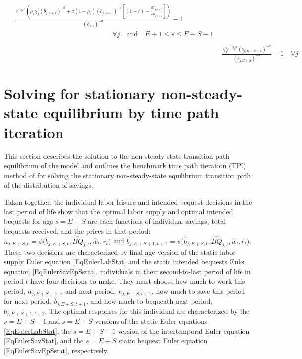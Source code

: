 \documentclass[letterpaper,12pt]{article}
\theoremstyle{definition}
\begin{document}
\begin{enumerate}
\begin{align}
        \begin{split}
          &\frac{e^{-g_y\sigma}\left(\rho_s\chi^b_j \left(\bar{b}_{j,s+1}\right)^{-\sigma} + \beta(1-\rho_s)(\bar{c}_{j,s+1})^{-\sigma}\left[(1 + \bar{r}) - \frac{\partial \bar{T}_{j,s+1}}{\partial \bar{b}_{j,s+1}}\right]\right)}{(\bar{c}_{j,s})^{-\sigma}} - 1 \\
          &\qquad\qquad\qquad\qquad\qquad\qquad\qquad\forall j \quad\text{and}\quad E+1\leq s\leq E+S-1 \\
        \end{split} \label{EqSSeulerrSav} \\
        &\frac{\chi^b_j e^{-g_y\sigma}(\bar{b}_{j,E+S+1})^{-\sigma}}{\left(\bar{c}_{j,E+S}\right)^{-\sigma}} - 1 \quad\forall j \label{EqSSeulerrBeq}
      \end{align}
  \end{enumerate}


\newpage
\section{Solving for stationary non-steady-state equilibrium by time path iteration}\label{AppNonSSsolve}

  \setcounter{equation}{0}

  This section describes the solution to the non-steady-state transition path equilibrium of the model and outlines the benchmark time path iteration (TPI) method of \citet{AuerbachKotlikoff:1987} for solving the stationary non-steady-state equilibrium transition path of the distribution of savings. 
 
  \vspace{10mm}

  \noindent Taken together, the individual labor-leisure and intended bequest decisions in the last period of life show that the optimal labor supply and optimal intended bequests for age $s=E+S$ are each functions of individual savings, total bequests received, and the prices in that period: $n_{j,E+S,t}=\phi\bigl(\hat{b}_{j,E+S,t},\hat{BQ}_{j,t},\hat{w}_t,r_t\bigr)$ and $\hat{b}_{j,E+S+1,t+1}=\psi\bigl(\hat{b}_{j,E+S,t},\hat{BQ}_{j,t},\hat{w}_t,r_t\bigr)$. These two decisions are characterized by final-age version of the static labor supply Euler equation \eqref{EqEulerLabStat} and the static intended bequests Euler equation \eqref{EqEulerSavEpSstat}. individuals in their second-to-last period of life in period $t$ have four decisions to make. They must choose how much to work this period, $n_{j,E+S-1,t}$, and next period, $n_{j,E+S,t+1}$, how much to save this period for next period, $\hat{b}_{j,E+S,t+1}$, and how much to bequeath next period, $\hat{b}_{j,E+S+1,t+2}$. The optimal responses for this individual are characterized by the $s=E+S-1$ and $s=E+S$ versions of the static Euler equations \eqref{EqEulerLabStat}, the $s=E+S-1$ version of the intertemporal Euler equation \eqref{EqEulerSavStat}, and the $s=E+S$ static bequest Euler equation \eqref{EqEulerSavEpSstat}, respectively.
\end{document}
